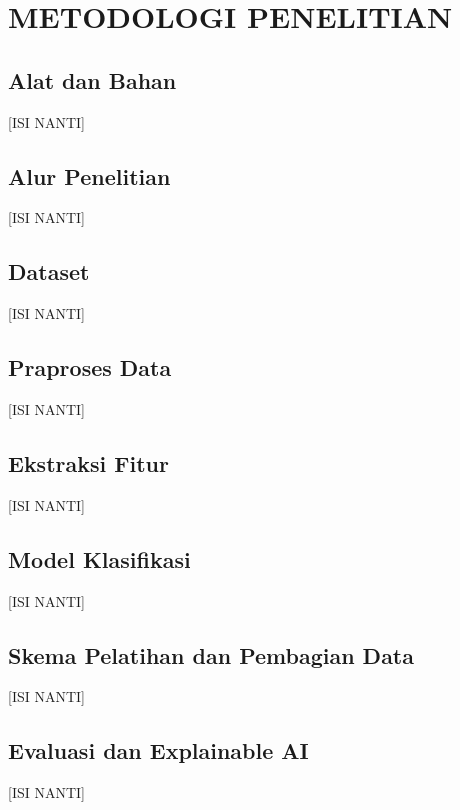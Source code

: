 \chapter{METODOLOGI PENELITIAN}

\section{Alat dan Bahan}
[ISI NANTI]

\section{Alur Penelitian}
[ISI NANTI]

\section{Dataset}
[ISI NANTI]

\section{Praproses Data}
[ISI NANTI]

\section{Ekstraksi Fitur}
[ISI NANTI]

\section{Model Klasifikasi}
[ISI NANTI]

\section{Skema Pelatihan dan Pembagian Data}
[ISI NANTI]

\section{Evaluasi dan Explainable AI}
[ISI NANTI]
